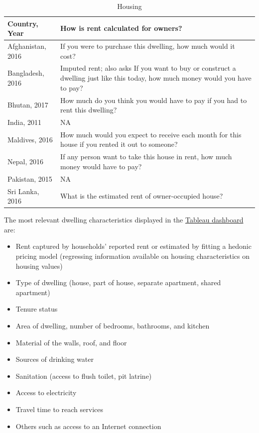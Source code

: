\documentclass[13 pt,]{book}
\providecommand{\tightlist}{%
  \setlength{\itemsep}{0pt}\setlength{\parskip}{0pt}}
\begin{document}
\begin{table}[t]

\caption{\label{tab:housing}Housing}
\centering
\begin{tabular}{ll}
\toprule
Country, Year & How is rent calculated for owners?\\
\midrule
Afghanistan, 2016 & If you were to purchase this dwelling, how much would it cost?\\
Bangladesh, 2016 & Imputed rent; also asks If you want to buy or construct a dwelling just like this today, how much money would you have to pay?\\
Bhutan, 2017 & How much do you think you would have to pay if you had to rent this dwelling?\\
India, 2011 & NA\\
Maldives, 2016 & How much would you expect to receive each month for this house if you rented it out to someone?\\
\addlinespace
Nepal, 2016 & If any person want to take this house in rent, how much money would have to pay?\\
Pakistan, 2015 & NA\\
Sri Lanka, 2016 & What is the estimated rent of owner-occupied house?\\
\bottomrule
\end{tabular}
\end{table}

The most relevant dwelling characteristics displayed in the
\href{https://tab.worldbank.org/\#/site/WBG/views/SAR_MNA_Metadata/Housing}{Tableau
dashboard} are:

\begin{itemize}
\tightlist
\item
  Rent captured by households' reported rent or estimated by fitting a
  hedonic pricing model (regressing information available on housing
  characteristics on housing values)
\item
  Type of dwelling (house, part of house, separate apartment, shared
  apartment)
\item
  Tenure status
\item
  Area of dwelling, number of bedrooms, bathrooms, and kitchen
\item
  Material of the walls, roof, and floor
\item
  Sources of drinking water
\item
  Sanitation (access to flush toilet, pit latrine)
\item
  Access to electricity
\item
  Travel time to reach services
\item
  Others such as access to an Internet connection
\end{itemize}
\end{document}
